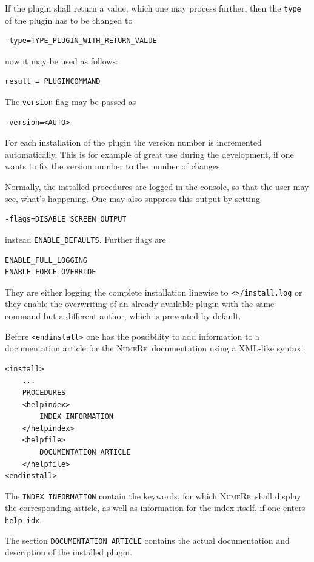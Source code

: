 \documentclass[DIV=14,headsepline,footsepline]{scrbook}
\newcommand{\NR}{\textsc{Nu\-me\-Re}}
\begin{document}
				If the plugin shall return a value, which one may process further, then the \lstinline+type+ of the plugin has to be changed to
				\begin{lstlisting}
-type=TYPE_PLUGIN_WITH_RETURN_VALUE
				\end{lstlisting}
				now it may be used as follows:
				\begin{lstlisting}
result = PLUGINCOMMAND
				\end{lstlisting}
				
				The \lstinline+version+ flag may be passed as
				\begin{lstlisting}
-version=<AUTO>
				\end{lstlisting}
				For each installation of the plugin the version number is incremented automatically. This is for example of great use during the development, if one wants to fix the version number to the number of changes.
				
				Normally, the installed procedures are logged in the console, so that the user may see, what's happening. One may also suppress this output by setting
				\begin{lstlisting}
-flags=DISABLE_SCREEN_OUTPUT
				\end{lstlisting}
				instead \lstinline+ENABLE_DEFAULTS+. Further flags are
				\begin{lstlisting}
ENABLE_FULL_LOGGING
ENABLE_FORCE_OVERRIDE
				\end{lstlisting}
				They are either logging the complete installation linewise to \verb+<>/install.log+ or they enable the overwriting of an already available plugin with the same command but a different author, which is prevented by default.
				
				Before \lstinline+<endinstall>+ one has the possibility to add information to a documentation article for the \NR\ documentation using a XML-like syntax:
				\begin{lstlisting}
<install>
	...
	PROCEDURES
	<helpindex>
		INDEX INFORMATION
	</helpindex>
	<helpfile>
		DOCUMENTATION ARTICLE
	</helpfile>
<endinstall>
				\end{lstlisting}
				The \lstinline+INDEX INFORMATION+ contain the keywords, for which \NR\ shall display the corresponding article, as well as information for the index itself, if one enters \lstinline+help idx+.
				
				The section \lstinline+DOCUMENTATION ARTICLE+ contains the actual documentation and description of the installed plugin.
				
\end{document}
